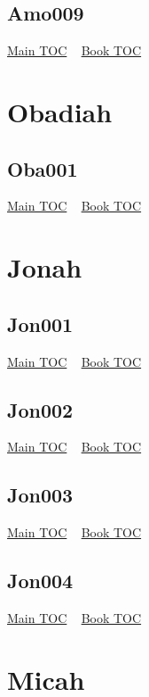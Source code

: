 \documentclass{book}
\begin{document}
  \section{Amo009}\hyperlink{toc}{Main TOC} ~ \hyperref[subsec:Amo]{Book TOC} 
  \chapter{Obadiah} \label{subsec:Oba} \begin{multicols}{2} \minitoc \end{multicols}
  \section{Oba001}\hyperlink{toc}{Main TOC} ~ \hyperref[subsec:Oba]{Book TOC} 
  \chapter{Jonah} \label{subsec:Jon} \begin{multicols}{2} \minitoc \end{multicols}
  \section{Jon001}\hyperlink{toc}{Main TOC} ~ \hyperref[subsec:Jon]{Book TOC} 
  \section{Jon002}\hyperlink{toc}{Main TOC} ~ \hyperref[subsec:Jon]{Book TOC} 
  \section{Jon003}\hyperlink{toc}{Main TOC} ~ \hyperref[subsec:Jon]{Book TOC} 
  \section{Jon004}\hyperlink{toc}{Main TOC} ~ \hyperref[subsec:Jon]{Book TOC} 
  \chapter{Micah} \label{subsec:Mic} \begin{multicols}{2} \minitoc \end{multicols}
\end{document}
